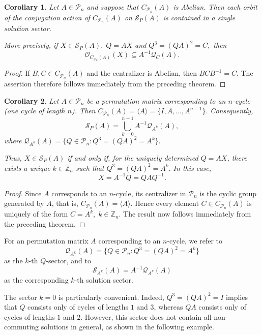 \documentclass{article}
\newtheorem{corollary}{Corollary}[section]
\theoremstyle{definition}\newtheorem{example}{Example}[section]
\def\P{{\mathcal{P}}}
\begin{document}
	\begin{corollary}
		Let $A\in \P_n$ and suppose that $C_{\P_n}(A)$ is Abelian.
		Then each orbit of the conjugation action of $C_{\P_n}(A)$ on
		$\mathcal S_P(A)$ is contained in a single solution sector.
		
		More precisely, if $X\in\mathcal S_P(A),\;Q=AX$ and $Q^3=(QA)^2=C,$
		then
		$$
		\mathcal O_{C_{\P_n}(A)}(X)\subseteq A^{-1}\mathcal Q_C(A).
		$$
	\end{corollary}
	
	\begin{proof}
		If $B,C\in C_{\P_n}(A)$ and the centralizer is Abelian, then $BCB^{-1}=C.$
		The assertion therefore follows immediately from the preceding theorem.
	\end{proof}
	
	\begin{corollary}
		Let $A\in \P_n$ be a permutation matrix corresponding to an $n$-cycle (one cycle of length $n$). Then
		$C_{\P_n}(A)=\langle A\rangle=\{I,A,\ldots,A^{n-1}\}.$
		Consequently,
		$$
		\mathcal S_P(A)=\bigcup_{k=0}^{n-1}A^{-1}\mathcal Q_{A^k}(A),
		$$
		where $\mathcal Q_{A^k}(A)=\{Q\in \P_n:Q^3=(QA)^2=A^k\}.$
		
		Thus, $X\in\mathcal S_P(A)$ if and only if, for the uniquely determined
		$Q=AX$, there exists a unique $k\in \mathbb{Z}_n$ such that $Q^3=(QA)^2=A^k.$
		In this case,
		$$
		X=A^{-1}Q=QAQ^{-1}.
		$$
	\end{corollary}
	
	\begin{proof}
		Since $A$ corresponds to an $n$-cycle, its centralizer in $\P_n$ is the cyclic group
		generated by $A$, that is, $C_{\P_n}(A)=\langle A\rangle.$
		Hence every element $C\in C_{\P_n}(A)$ is uniquely of the form
		$C=A^k,\; k\in \mathbb{Z}_n.$ The result now follows immediately from the preceding theorem.
	\end{proof}
	
	For an permutation matrix $A$ corresponding to an $n$-cycle, we refer to
	$$
	\mathcal Q_{A^k}(A)=\{Q\in \P_n:Q^3=(QA)^2=A^k\}
	$$
	as the $k$-th $Q$-sector, and to
	$$
	\mathcal S_{A^k}(A)=A^{-1}\mathcal Q_{A^k}(A)
	$$
	as the corresponding $k$-th solution sector.
	
	The sector $k=0$ is particularly convenient. Indeed, $Q^3=(QA)^2=I$
	implies that $Q$ consists only of cycles of lengths $1$ and $3$, whereas
	$QA$ consists only of cycles of lengths $1$ and $2$. However, this sector does not contain all non-commuting solutions in general, as shown in the following example.
	
\end{document}
